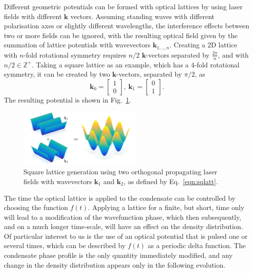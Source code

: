 Different geometric potentials can be formed with optical lattices by using laser fields with different $\mathbf{k}$ vectors. Assuming standing waves with different polarisation axes or slightly different wavelengths, the interference effects between two or more fields can be ignored, with the resulting optical field given by the summation of lattice potentials with wavevectors $\mathbf{k}_{1,..,n}$. Creating a 2D lattice with $n$-fold rotational symmetry requires $n/2$ $\mathbf{k}$-vectors separated by $\frac{2\pi}{n}$, and with $n/2 \in \mathbb{Z}^{+}$. Taking a square lattice as an example, which has a 4-fold rotational symmetry, it can be created by two $\mathbf{k}$-vectors, separated by $\pi/2$, as
\begin{equation}
    \mathbf{k}_0 = \left[ \begin{array}{cc}
    1 \\
    0
    \end{array} \right],~
    \mathbf{k}_1 =
    \left[ \begin{array}{cc}
     0 \\
     1
    \end{array} \right].\label{eqn:sqlatt}
\end{equation}
The resulting potential is shown in Fig.~\ref{fig:cos2xy}.
\begin{figure}\centering
    \includegraphics[width=0.55\textwidth]{./Images/ch4_vtx/VOPT/squarelatt}
    \caption{Square lattice generation using two orthogonal propagating laser fields with wavevectors $\mathbf{k}_1$ and $\mathbf{k}_2$, as defined by Eq.~\eqref{eqn:sqlatt}.}\label{fig:cos2xy}
\end{figure}
The time the optical lattice is applied to the condensate can be controlled by choosing the function $f(t)$. Applying a lattice for a finite, but short, time only will lead to a modification of the wavefunction phase, which then subsequently, and on a much longer time-scale, will have an effect on the density distribution. Of particular interest to us is the use of an optical potential that is pulsed one or several times, which can be described by $f(t)$ as a periodic delta function. The condensate phase profile is the only quantity immediately modified, and any change in the density distribution appears only in the following evolution.

